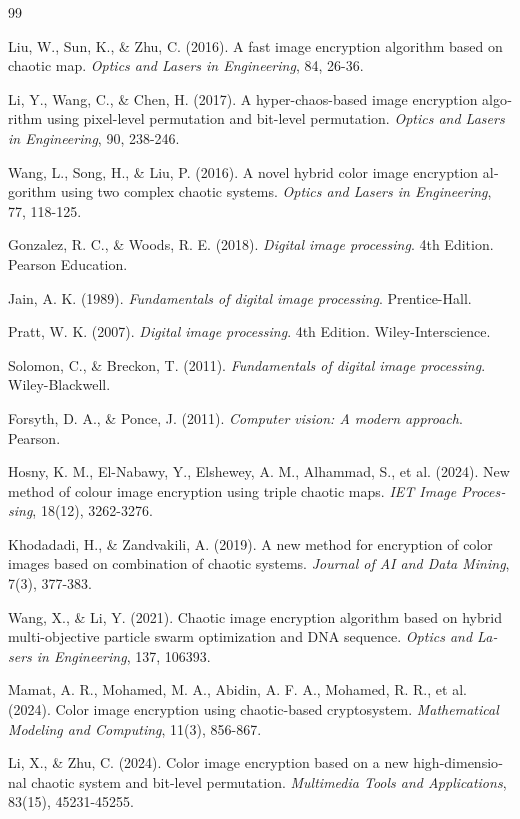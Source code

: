 \documentclass[a4paper,12pt]{report}
\renewcommand{\%}{\lr{\oldpercent}}
\begin{document}
\begin{thebibliography}{99}
\begin{LTRbibitems}
\begin{latin}
 Liu, W., Sun, K., \& Zhu, C. (2016). A fast image encryption algorithm based on chaotic map. \textit{Optics and Lasers in Engineering}, 84, 26-36.

 Li, Y., Wang, C., \& Chen, H. (2017). A hyper-chaos-based image encryption algorithm using pixel-level permutation and bit-level permutation. \textit{Optics and Lasers in Engineering}, 90, 238-246.

 Wang, L., Song, H., \& Liu, P. (2016). A novel hybrid color image encryption algorithm using two complex chaotic systems. \textit{Optics and Lasers in Engineering}, 77, 118-125.

 Gonzalez, R. C., \& Woods, R. E. (2018). \textit{Digital image processing}. 4th Edition. Pearson Education.

 Jain, A. K. (1989). \textit{Fundamentals of digital image processing}. Prentice-Hall.

 Pratt, W. K. (2007). \textit{Digital image processing}. 4th Edition. Wiley-Interscience.

 Solomon, C., \& Breckon, T. (2011). \textit{Fundamentals of digital image processing}. Wiley-Blackwell.

 Forsyth, D. A., \& Ponce, J. (2011). \textit{Computer vision: A modern approach}. Pearson.

 Hosny, K. M., El-Nabawy, Y., Elshewey, A. M., Alhammad, S., et al. (2024). New method of colour image encryption using triple chaotic maps. \textit{IET Image Processing}, 18(12), 3262-3276.

 Khodadadi, H., \& Zandvakili, A. (2019). A new method for encryption of color images based on combination of chaotic systems. \textit{Journal of AI and Data Mining}, 7(3), 377-383.

 Wang, X., \& Li, Y. (2021). Chaotic image encryption algorithm based on hybrid multi-objective particle swarm optimization and DNA sequence. \textit{Optics and Lasers in Engineering}, 137, 106393.

 Mamat, A. R., Mohamed, M. A., Abidin, A. F. A., Mohamed, R. R., et al. (2024). Color image encryption using chaotic-based cryptosystem. \textit{Mathematical Modeling and Computing}, 11(3), 856-867.

 Li, X., \& Zhu, C. (2024). Color image encryption based on a new high-dimensional chaotic system and bit-level permutation. \textit{Multimedia Tools and Applications}, 83(15), 45231-45255.


\end{latin}
\end{LTRbibitems}
\end{thebibliography}
\end{document}
